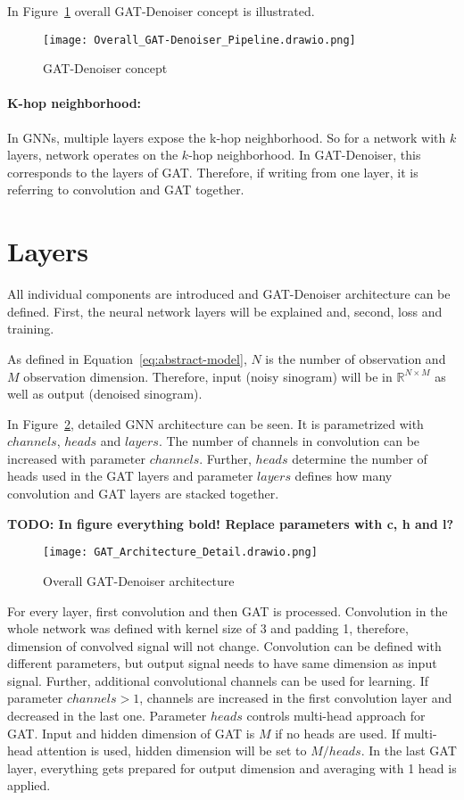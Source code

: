 In Figure~\ref{fig:overall-concept} overall GAT-Denoiser concept is illustrated.
\begin{figure}[H]
  \centering
  \texttt{[image: Overall\_GAT-Denoiser\_Pipeline.drawio.png]}
  \caption{GAT-Denoiser concept}
  \label{fig:overall-concept}
\end{figure}



\paragraph{K-hop neighborhood:}
In GNNs, multiple layers expose the k-hop neighborhood. So for a network with $k$ layers,
network operates on the $k$-hop neighborhood. In GAT-Denoiser, this corresponds
to the layers of GAT. Therefore, if writing from one layer, it is referring to convolution and GAT together.

\section{Layers}

All individual components are introduced and GAT-Denoiser architecture can be defined.
First, the neural network layers will be explained and, second, loss and training.

As defined in Equation~\ref{eq:abstract-model}, $N$ is the number of observation and
$M$ observation dimension. 
Therefore, input (noisy sinogram) will be in $\mathbb{R}^{N \times M}$ as well as output (denoised sinogram). 

In Figure~\ref{fig:architecture-detailed}, detailed GNN architecture can be seen.
It is parametrized with $channels$, $heads$ and $layers$. 
The number of channels in convolution can be increased with parameter $channels$.
Further, $heads$ determine the number of heads used in the GAT layers and parameter 
$layers$ defines how many convolution and GAT layers are stacked together.

\textbf{TODO: In figure everything bold! Replace parameters with c, h and l?}

\begin{figure}[H]
  \centering
  \texttt{[image: GAT\_Architecture\_Detail.drawio.png]}
  \caption{Overall GAT-Denoiser architecture}
  \label{fig:architecture-detailed}
\end{figure}


For every layer, first convolution and then GAT is processed. 
Convolution in the whole network was defined with kernel size of 3 and padding 1,
therefore, dimension of convolved signal will not change. 
Convolution can be defined with different parameters, but output signal needs to have 
same dimension as input signal.
Further, additional convolutional channels can be used for learning.
If parameter $channels > 1$, channels are increased in the first convolution layer 
and decreased in the last one.
Parameter $heads$ controls multi-head approach for GAT. Input and hidden dimension
of GAT is $M$ if no heads are used.
If multi-head attention is used, hidden dimension will be set to $M / heads$.
In the last GAT layer, everything gets prepared for output dimension and 
averaging with 1 head is applied.

